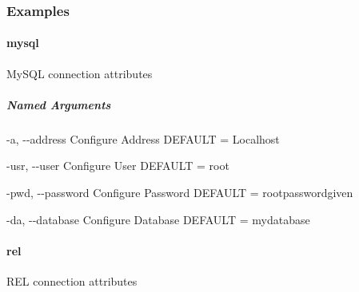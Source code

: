\documentclass[letterpaper,10pt,english,openany,oneside]{sphinxmanual}
\begin{document}
\subsubsection{Examples}

\begin{sphinxVerbatim}[commandchars=\\\{\}]
    
\end{sphinxVerbatim}

\paragraph{mysql}
\label{\detokenize{cmd_main:mysql}}
MySQL connection attributes

\begin{sphinxVerbatim}[commandchars=\\\{\}]
   \PYG{p}{[}\PYG{p}{]} \PYG{p}{[} \PYG{p}{]} \PYG{p}{[} \PYG{p}{]} \PYG{p}{[} \PYG{p}{]}
                   \PYG{p}{[} \PYG{p}{]}
\end{sphinxVerbatim}



\subparagraph{Named Arguments}
\label{\detokenize{cmd_main:Named Arguments_repeat16}}\begin{optionlist}{3cm}
\item [-a, -{-}address]  
Configure Address DEFAULT = Localhost
\item [-usr, -{-}user]  
Configure User DEFAULT = root
\item [-pwd, -{-}password]  
Configure Password DEFAULT = rootpasswordgiven
\item [-da, -{-}database]  
Configure Database DEFAULT = mydatabase
\end{optionlist}


\paragraph{rel}
\label{\detokenize{cmd_main:rel}}
REL connection attributes

\begin{sphinxVerbatim}[commandchars=\\\{\}]
   \PYG{p}{[}\PYG{p}{]}
\end{sphinxVerbatim}



\renewcommand{\indexname}{Index}
\printindex
\end{document}
